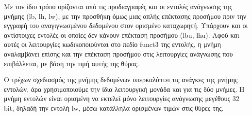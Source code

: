 \documentclass[11pt]{extarticle}
\begin{document}
Με τον ίδιο τρόπο ορίζονται από τις προδιαγραφές και οι εντολές ανάγνωσης της μνήμης (lb, lh, lw), με την προσθήκη όμως μιας απλής επέκτασης προσήμου πριν την εγγραφή του αναγιγνωσμένου δεδομένου στον ορισμένο καταχωρητή. Υπάρχουν και οι αντίστοιχες εντολές οι οποίες δεν κάνουν επέκταση προσήμου (lbu, lhu).
Αφού και αυτές οι λειτουργίες κωδικοποιούνται στο πεδίο funct3 της εντολής, η μνήμη αναλαμβάνει επίσης και την επέκταση προσήμου στις λειτουργίες ανάγνωσης που επιβάλλεται, με βάση την τιμή αυτής της θύρας. 

Ο τρέχων σχεδιασμός της μνήμης δεδομένων υπερκαλύπτει τις ανάγκες της μνήμης εντολών, άρα χρησιμοποιούμε την ίδια λειτουργική μονάδα και για τις δύο μνήμες.
Η μνήμη εντολών είναι ορισμένη να εκτελεί μόνο λειτουργίες ανάγνωσης μεγέθους 32 bit\footnotemark, δηλαδή την εντολή lw, μέσω κατάλληλα ορισμένων τιμών στις θύρες της.
\newline
\end{document}
